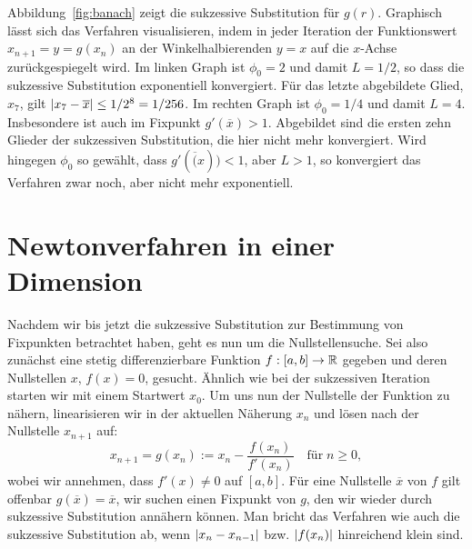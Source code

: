Abbildung~\ref{fig:banach} zeigt die sukzessive Substitution für
$g(r)$. Graphisch lässt sich das Verfahren visualisieren, indem in
jeder Iteration der Funktionswert $x_{n+1} = y =g(x_{n})$ an der
Winkelhalbierenden $y=x$ auf die $x$-Achse zurückgespiegelt wird. Im
linken Graph ist $\phi_0=2$ und damit $L=1/2$, so dass die sukzessive
Substitution exponentiell konvergiert. Für das letzte abgebildete
Glied, $x_7$, gilt $\left\lvert{x_7-\overline{x}}\right\rvert \le 1/2^8 = 1/256$. Im
rechten Graph ist $\phi_0=1/4$ und damit $L=4$. Insbesondere ist auch
im Fixpunkt $g'(\overline x)>1$. Abgebildet sind die ersten zehn
Glieder der sukzessiven Substitution, die hier nicht mehr
konvergiert. Wird hingegen $\phi_0$ so gewählt, dass 
$g'(\overline(x))<1$, aber $L>1$, so konvergiert das Verfahren zwar
noch, aber nicht mehr exponentiell.

\section{Newtonverfahren in einer Dimension}

Nachdem wir bis jetzt die sukzessive Substitution zur Bestimmung von
Fixpunkten betrachtet haben, geht es nun um die Nullstellensuche. Sei
also zunächst eine stetig differenzierbare Funktion $f:[a,b]\to\mathbb{R}$
gegeben und deren Nullstellen $x$, $f(x) = 0$, gesucht. Ähnlich wie
bei der sukzessiven Iteration starten wir mit einem Startwert
$x_0$. Um uns nun der Nullstelle der Funktion zu nähern, linearisieren
wir in der aktuellen Näherung $x_n$ und lösen nach der Nullstelle
$x_{n+1}$ auf:
\begin{equation}
  x_{n+1} = g(x_n) := x_n - \frac{f(x_n)}{f'(x_n)}\quad\text{für}\; n\ge 0,
\end{equation}
wobei wir annehmen, dass $f'(x)\neq 0$ auf $[a,b]$.  Für eine
Nullstelle $\overline{x}$ von $f$ gilt offenbar $g(\overline{x}) =
\overline{x}$, \dh wir suchen einen Fixpunkt von $g$, den wir wieder
durch sukzessive Substitution annähern können. Man bricht das
Verfahren wie auch die sukzessive Substitution ab, wenn
$\left\lvert{x_{n}-x_{n-1}}\right\rvert$ bzw. $\left\lvert{f(x_n)}\right\rvert$ hinreichend klein sind.

